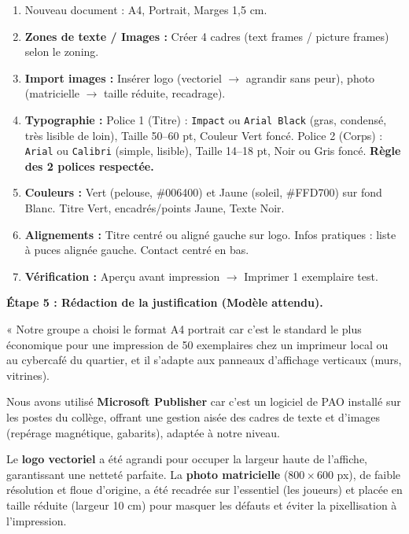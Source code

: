 \documentclass[11pt]{article}
\begin{document}
\begin{exoresolu}
\begin{enumerate}
\item Nouveau document : A4, Portrait, Marges 1,5 cm.
\item \textbf{Zones de texte / Images :} Créer 4 cadres (text frames / picture frames) selon le zoning.
\item \textbf{Import images :} Insérer logo (vectoriel $\rightarrow$ agrandir sans peur), photo (matricielle $\rightarrow$ taille réduite, recadrage).
\item \textbf{Typographie :} Police 1 (Titre) : \texttt{Impact} ou \texttt{Arial Black} (gras, condensé, très lisible de loin), Taille 50--60 pt, Couleur Vert foncé. Police 2 (Corps) : \texttt{Arial} ou \texttt{Calibri} (simple, lisible), Taille 14--18 pt, Noir ou Gris foncé. \textbf{Règle des 2 polices respectée.}
\item \textbf{Couleurs :} Vert (pelouse, \#006400) et Jaune (soleil, \#FFD700) sur fond Blanc. Titre Vert, encadrés/points Jaune, Texte Noir.
\item \textbf{Alignements :} Titre centré ou aligné gauche sur logo. Infos pratiques : liste à puces alignée gauche. Contact centré en bas.
\item \textbf{Vérification :} Aperçu avant impression $\rightarrow$ Imprimer 1 exemplaire test.
\end{enumerate}

\textbf{Étape 5 : Rédaction de la justification (Modèle attendu).}

\begin{exemplebox}
« Notre groupe a choisi le format A4 portrait car c'est le standard le plus économique pour une impression de 50 exemplaires chez un imprimeur local ou au cybercafé du quartier, et il s'adapte aux panneaux d'affichage verticaux (murs, vitrines).

Nous avons utilisé \textbf{Microsoft Publisher} car c'est un logiciel de PAO installé sur les postes du collège, offrant une gestion aisée des cadres de texte et d'images (repérage magnétique, gabarits), adaptée à notre niveau.

Le \textbf{logo vectoriel} a été agrandi pour occuper la largeur haute de l'affiche, garantissant une netteté parfaite. La \textbf{photo matricielle} ($800 \times 600$ px), de faible résolution et floue d'origine, a été recadrée sur l'essentiel (les joueurs) et placée en taille réduite (largeur 10 cm) pour masquer les défauts et éviter la pixellisation à l'impression.


\end{exemplebox}
\end{exoresolu}
\end{document}
